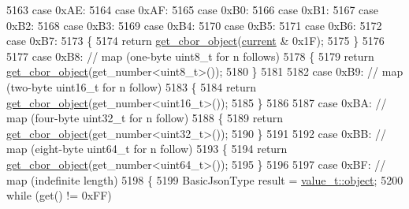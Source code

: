 \begin{DoxyCode}
5163             \textcolor{keywordflow}{case} 0xAE:
5164             \textcolor{keywordflow}{case} 0xAF:
5165             \textcolor{keywordflow}{case} 0xB0:
5166             \textcolor{keywordflow}{case} 0xB1:
5167             \textcolor{keywordflow}{case} 0xB2:
5168             \textcolor{keywordflow}{case} 0xB3:
5169             \textcolor{keywordflow}{case} 0xB4:
5170             \textcolor{keywordflow}{case} 0xB5:
5171             \textcolor{keywordflow}{case} 0xB6:
5172             \textcolor{keywordflow}{case} 0xB7:
5173             \{
5174                 \textcolor{keywordflow}{return} \hyperlink{classnlohmann_1_1detail_1_1binary__reader_ac10de53e05ff19b4860c73f52a6871a9}{get\_cbor\_object}(\hyperlink{classnlohmann_1_1detail_1_1binary__reader_a7e994e201b215cd6d6ae28a1853f43e0}{current} & 0x1F);
5175             \}
5176 
5177             \textcolor{keywordflow}{case} 0xB8: \textcolor{comment}{// map (one-byte uint8\_t for n follows)}
5178             \{
5179                 \textcolor{keywordflow}{return} \hyperlink{classnlohmann_1_1detail_1_1binary__reader_ac10de53e05ff19b4860c73f52a6871a9}{get\_cbor\_object}(get\_number<uint8\_t>());
5180             \}
5181 
5182             \textcolor{keywordflow}{case} 0xB9: \textcolor{comment}{// map (two-byte uint16\_t for n follow)}
5183             \{
5184                 \textcolor{keywordflow}{return} \hyperlink{classnlohmann_1_1detail_1_1binary__reader_ac10de53e05ff19b4860c73f52a6871a9}{get\_cbor\_object}(get\_number<uint16\_t>());
5185             \}
5186 
5187             \textcolor{keywordflow}{case} 0xBA: \textcolor{comment}{// map (four-byte uint32\_t for n follow)}
5188             \{
5189                 \textcolor{keywordflow}{return} \hyperlink{classnlohmann_1_1detail_1_1binary__reader_ac10de53e05ff19b4860c73f52a6871a9}{get\_cbor\_object}(get\_number<uint32\_t>());
5190             \}
5191 
5192             \textcolor{keywordflow}{case} 0xBB: \textcolor{comment}{// map (eight-byte uint64\_t for n follow)}
5193             \{
5194                 \textcolor{keywordflow}{return} \hyperlink{classnlohmann_1_1detail_1_1binary__reader_ac10de53e05ff19b4860c73f52a6871a9}{get\_cbor\_object}(get\_number<uint64\_t>());
5195             \}
5196 
5197             \textcolor{keywordflow}{case} 0xBF: \textcolor{comment}{// map (indefinite length)}
5198             \{
5199                 BasicJsonType result = \hyperlink{namespacenlohmann_1_1detail_a1ed8fc6239da25abcaf681d30ace4985aa8cfde6331bd59eb2ac96f8911c4b666}{value\_t::object};
5200                 \textcolor{keywordflow}{while} (\textcolor{keyword}{get}() != 0xFF)

\end{DoxyCode}
